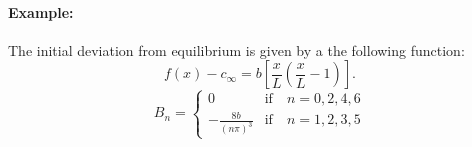 \paragraph{Example:} The initial deviation from equilibrium is given by a the following function:
\begin{equation}
  f(x)-c_\infty = b \left[\frac{x}{L}\left( \frac{x}{L}-1 \right) \right].
\end{equation}
\begin{equation}
  B_n = \begin{cases}
    \displaystyle 0 & \text{if} \quad n=0,2,4,6 \\[10pt]
    \displaystyle -\frac{8b}{(n\pi)^3}& \text{if} \quad n=1,2,3,5
  \end{cases}
\end{equation}





